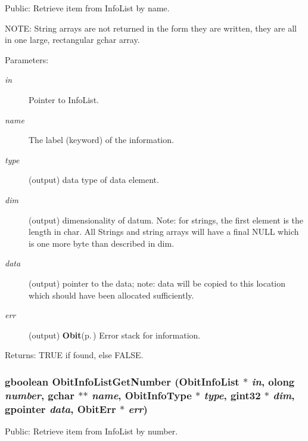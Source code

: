 Public: Retrieve item from Info\-List by name. 

NOTE: String arrays are not returned in the form they are written, they are all in one large, rectangular gchar array. \begin{Desc}
\item[Parameters:]
\begin{description}
\item[{\em in}]Pointer to Info\-List. \item[{\em name}]The label (keyword) of the information. \item[{\em type}](output) data type of data element. \item[{\em dim}](output) dimensionality of datum. Note: for strings, the first element is the length in char. All Strings and string arrays will have a final NULL which is one more byte than described in dim. \item[{\em data}](output) pointer to the data; note: data will be copied to this location which should have been allocated sufficiently. \item[{\em err}](output) {\bf Obit}{\rm (p.\,\pageref{structObit})} Error stack for information. \end{description}
\end{Desc}
\begin{Desc}
\item[Returns:]TRUE if found, else FALSE. \end{Desc}
\subsubsection{\setlength{\rightskip}{0pt plus 5cm}gboolean Obit\-Info\-List\-Get\-Number ({\bf Obit\-Info\-List} $\ast$ {\em in}, {\bf olong} {\em number}, gchar $\ast$$\ast$ {\em name}, Obit\-Info\-Type $\ast$ {\em type}, gint32 $\ast$ {\em dim}, gpointer {\em data}, {\bf Obit\-Err} $\ast$ {\em err})}\label{ObitInfoList_8c_a18}


Public: Retrieve item from Info\-List by number. 

